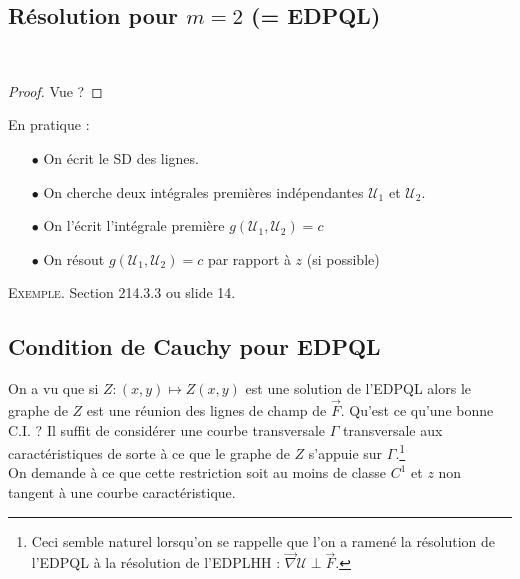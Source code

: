 	\subsection{Résolution pour $m=2$ (= EDPQL)}
	\
	
	
	\begin{proof}
	Vue ? 
	\end{proof}
	
	En pratique :
	\begin{itemize}
	\item[$\bullet$] On écrit le SD des lignes.
	\item[$\bullet$] On cherche deux intégrales premières indépendantes 
	$\mathcal{U}_1$ et $\mathcal{U}_2$.
	\item[$\bullet$] On l'écrit l'intégrale première $g(\mathcal{U}_1,
	\mathcal{U}_2) =c$
	\item[$\bullet$] On résout $g(\mathcal{U}_1,\mathcal{U}_2) =c$ par 
	rapport à $z$ (si possible)
	\end{itemize}
	\textsc{Exemple}. Section 214.3.3 ou slide 14.
	
	
	\setcounter{subsection}{3}
	\subsection{Condition de Cauchy pour EDPQL}
	On a vu que si $Z : (x,y)\mapsto Z(x,y)$ est une solution de l'EDPQL 
	alors le graphe de $Z$ est une réunion des lignes de champ de $\vec 
	F$. Qu'est ce qu'une bonne C.I. ? Il suffit de considérer une courbe 
	transversale $\Gamma$ transversale aux caractéristiques de sorte à ce 
	que le graphe de $Z$ s'appuie sur $\Gamma$.\footnote{Ceci semble naturel 
	lorsqu'on se rappelle que l'on a ramené la résolution de l'EDPQL à la 
	résolution de l'EDPLHH : $\vec\nabla \mathcal{U}\perp\vec{F}$.}\\
	On demande à ce que cette restriction soit au moins de classe $C^1$ 
	et $z$ non tangent à une courbe caractéristique.
	
